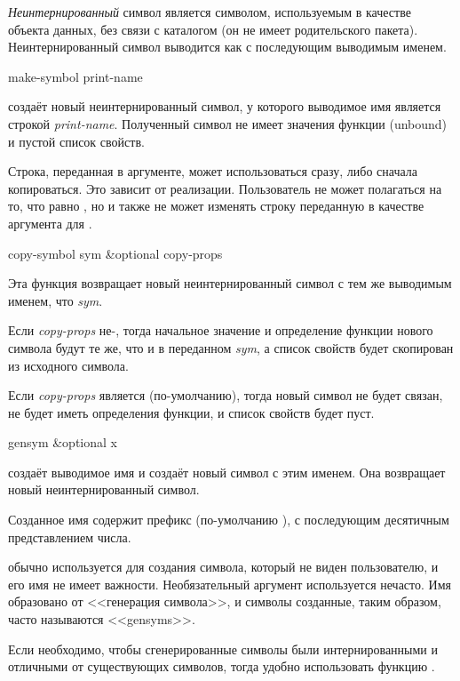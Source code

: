 \emph{Неинтернированный} символ является символом, используемым в качестве
объекта данных, без связи с каталогом (он не имеет родительского пакета).
Неинтернированный символ выводится как \cd{\#:} с последующим выводимым именем.

\begin{defun}[Function]
make-symbol print-name

 создаёт новый неинтернированный символ, у
которого выводимое имя является строкой \emph{print-name}. Полученный символ не
имеет значения функции (unbound) и пустой список свойств.

Строка, переданная в аргументе, может использоваться сразу, либо сначала
копироваться. Это зависит от реализации.
Пользователь не может полагаться на то, что  равно  , но и также не может изменять строку
переданную в качестве аргумента для .
\end{defun}

\begin{defun}[Function]
copy-symbol sym &optional copy-props

Эта функция возвращает новый неинтернированный символ с тем же выводимым именем,
что \emph{sym}.

Если \emph{copy-props} не-{\nil}, тогда начальное значение и определение функции
нового символа будут те же, что и в переданном \emph{sym}, а список свойств будет
скопирован из исходного символа.

Если \emph{copy-props} является {\nil} (по-умолчанию), тогда новый символ не
будет связан, не будет иметь определения функции, и список свойств будет пуст.
\end{defun}

\begin{defun}[Function]
gensym &optional x

 создаёт выводимое имя и создаёт новый символ с этим именем.
Она возвращает новый неинтернированный символ.

Созданное имя содержит префикс (по-умолчанию ), с последующим десятичным
представлением числа.

 обычно используется для создания символа, который не виден
пользователю, и его имя не имеет важности.
Необязательный аргумент используется нечасто. Имя образовано от <<генерация
символа>>, и символы созданные, таким образом, часто называются <<gensyms>>.

Если необходимо, чтобы сгенерированные символы были интернированными и отличными
от существующих символов, тогда удобно использовать функцию .
\end{defun}


